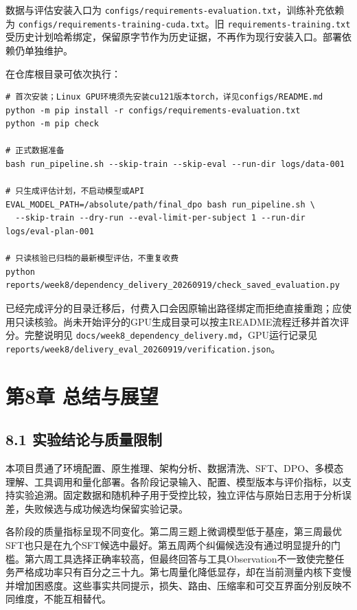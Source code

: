 \documentclass[UTF8,fontset=fandol,a4paper,11pt]{ctexart}
\begin{document}
数据与评估安装入口为
\nolinkurl{configs/requirements-evaluation.txt}，训练补充依赖为
\nolinkurl{configs/requirements-training-cuda.txt}。旧
\nolinkurl{requirements-training.txt}
受历史计划哈希绑定，保留原字节作为历史证据，不再作为现行安装入口。部署依赖仍单独维护。

在仓库根目录可依次执行：

\begin{Verbatim}[breaklines,breakanywhere,fontsize=\small]
# 首次安装；Linux GPU环境须先安装cu121版本torch，详见configs/README.md
python -m pip install -r configs/requirements-evaluation.txt
python -m pip check

# 正式数据准备
bash run_pipeline.sh --skip-train --skip-eval --run-dir logs/data-001

# 只生成评估计划，不启动模型或API
EVAL_MODEL_PATH=/absolute/path/final_dpo bash run_pipeline.sh \
  --skip-train --dry-run --eval-limit-per-subject 1 --run-dir logs/eval-plan-001

# 只读核验已归档的最新模型评估，不重复收费
python reports/week8/dependency_delivery_20260919/check_saved_evaluation.py
\end{Verbatim}

已经完成评分的目录迁移后，付费入口会因原输出路径绑定而拒绝直接重跑；应使用只读核验。尚未开始评分的GPU生成目录可以按主README流程迁移并首次评分。完整说明见
\nolinkurl{docs/week8_dependency_delivery.md}，GPU运行记录见
\nolinkurl{reports/week8/delivery_eval_20260919/verification.json}。

\section{第8章
总结与展望}\label{ux7b2c8ux7ae0-ux603bux7ed3ux4e0eux5c55ux671b}

\subsection{8.1 实验结论与质量限制}\label{ux5b9eux9a8cux7ed3ux8bbaux4e0eux8d28ux91cfux9650ux5236}

本项目贯通了环境配置、原生推理、架构分析、数据清洗、SFT、DPO、多模态理解、工具调用和量化部署。各阶段记录输入、配置、模型版本与评价指标，以支持实验追溯。固定数据和随机种子用于受控比较，独立评估与原始日志用于分析误差，失败候选与成功候选均保留实验记录。

各阶段的质量指标呈现不同变化。第二周三题上微调模型低于基座，第三周最优SFT也只是在九个SFT候选中最好。第五周两个纠偏候选没有通过明显提升的门槛。第六周工具选择正确率较高，但最终回答与工具Observation不一致使完整任务严格成功率只有百分之三十九。第七周量化降低显存，却在当前测量内核下变慢并增加困惑度。这些事实共同提示，损失、路由、压缩率和可交互界面分别反映不同维度，不能互相替代。
\end{document}
